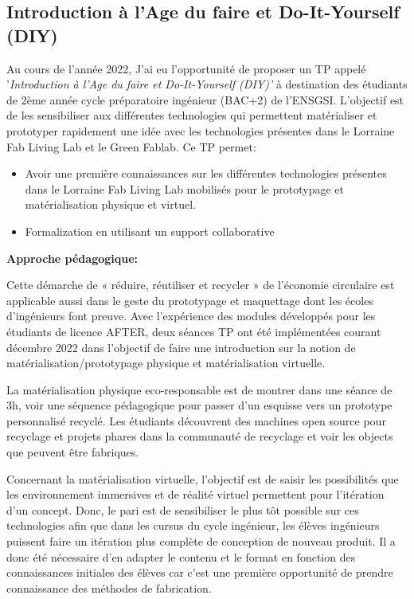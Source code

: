 \documentclass[
  11pt,
]{article}
\providecommand{\tightlist}{%
  \setlength{\itemsep}{0pt}\setlength{\parskip}{0pt}}\usepackage{longtable,booktabs,array}
\begin{document}
\hypertarget{introduction-uxe0-lage-du-faire-et-do-it-yourself-diy}{%
\subsection{Introduction à l'Age du faire et Do-It-Yourself
(DIY)}\label{introduction-uxe0-lage-du-faire-et-do-it-yourself-diy}}

Au cours de l'année 2022, J'ai eu l'opportunité de proposer un TP appelé
'\emph{Introduction à l'Age du faire et Do-It-Yourself (DIY)'} à
destination des étudiants de 2ème année cycle préparatoire ingénieur
(BAC+2) de l'ENSGSI. L'objectif est de les sensibiliser aux différentes
technologies qui permettent matérialiser et prototyper rapidement une
idée avec les technologies présentes dans le Lorraine Fab Living Lab et
le Green Fablab. Ce TP permet:

\begin{itemize}
\tightlist
\item
  Avoir une première connaissances sur les différentes technologies
  présentes dans le Lorraine Fab Living Lab mobilisés pour le
  prototypage et matérialisation physique et virtuel.
\item
  Formalization en utilisant un support collaborative
\end{itemize}

\textbf{Approche pédagogique: }

Cette démarche de « réduire, réutiliser et recycler » de l'économie
circulaire est applicable aussi dans le geste du prototypage et
maquettage dont les écoles d'ingénieurs font preuve. Avec l'expérience
des modules développés pour les étudiants de licence AFTER, deux séances
TP ont été implémentées courant décembre 2022 dans l'objectif de faire
une introduction sur la notion de matérialisation/prototypage physique
et matérialisation virtuelle.

La matérialisation physique eco-responsable est de montrer dans une
séance de 3h, voir une séquence pédagogique pour passer d'un esquisse
vers un prototype personnalisé recyclé. Les étudiants découvrent des
machines open source pour recyclage et projets phares dans la communauté
de recyclage et voir les objects que peuvent être fabriques.

Concernant la matérialisation virtuelle, l'objectif est de saisir les
possibilités que les environnement immersives et de réalité virtuel
permettent pour l'itération d'un concept. Donc, le pari est de
sensibiliser le plus tôt possible sur ces technologies afin que dans les
cursus du cycle ingénieur, les élèves ingénieurs puissent faire un
itération plus complète de conception de nouveau produit. Il a donc été
nécessaire d'en adapter le contenu et le format en fonction des
connaissances initiales des élèves car c'est une première opportunité de
prendre connaissance des méthodes de fabrication.
\end{document}
